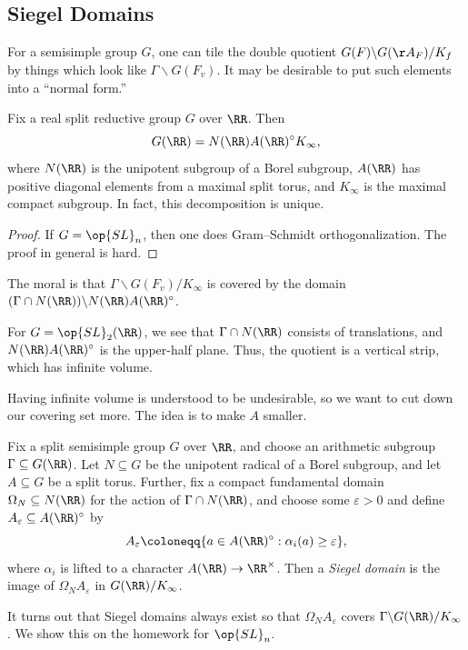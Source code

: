 \documentclass[../notes.tex]{subfiles}
\begin{document}
\subsection{Siegel Domains}
For a semisimple group $G$, one can tile the double quotient $G(F)\backslash G(\AA_F)/K_f$ by things which look like $\Gamma\backslash G(F_v)$. It may be desirable to put such elements into a ``normal form.''
\begin{theorem} \label{thm:iwasawa}
	Fix a real split reductive group $G$ over $\RR$. Then
	\[G(\RR)=N(\RR)A(\RR)^\circ K_\infty,\]
	where $N(\RR)$ is the unipotent subgroup of a Borel subgroup, $A(\RR)$ has positive diagonal elements from a maximal split torus, and $K_\infty$ is the maximal compact subgroup. In fact, this decomposition is unique.
\end{theorem}
\begin{proof}
	If $G=\op{SL}_n$, then one does Gram--Schmidt orthogonalization. The proof in general is hard.
\end{proof}
The moral is that $\Gamma\backslash G(F_v)/K_\infty$ is covered by the domain $(\Gamma\cap N(\RR))\backslash N(\RR)A(\RR)^\circ$.
\begin{example}
	For $G=\op{SL}_2(\RR)$, we see that $\Gamma\cap N(\RR)$ consists of translations, and $N(\RR)A(\RR)^\circ$ is the upper-half plane. Thus, the quotient is a vertical strip, which has infinite volume.
\end{example}
Having infinite volume is understood to be undesirable, so we want to cut down our covering set more. The idea is to make $A$ smaller.
\begin{definition}
	Fix a split semisimple group $G$ over $\RR$, and choose an arithmetic subgroup $\Gamma\subseteq G(\RR)$. Let $N\subseteq G$ be the unipotent radical of a Borel subgroup, and let $A\subseteq G$ be a split torus. Further, fix a compact fundamental domain $\Omega_N\subseteq N(\RR)$ for the action of $\Gamma\cap N(\RR)$, and choose some $\varepsilon>0$ and define $A_\varepsilon\subseteq A(\RR)^\circ$ by
	\[A_\varepsilon\coloneqq\{a\in A(\RR)^\circ:\alpha_i(a)\ge\varepsilon\},\]
	where $\alpha_i$ is lifted to a character $A(\RR)\to\RR^\times$. Then a \textit{Siegel domain} is the image of $\Omega_NA_\varepsilon$ in $G(\RR)/K_\infty$.
\end{definition}
\begin{remark} \label{rem:siegel-domain-exists}
	It turns out that Siegel domains always exist so that $\Omega_NA_\varepsilon$ covers $\Gamma\backslash G(\RR)/K_\infty$. We show this on the homework for $\op{SL}_n$.
\end{remark}
\end{document}
